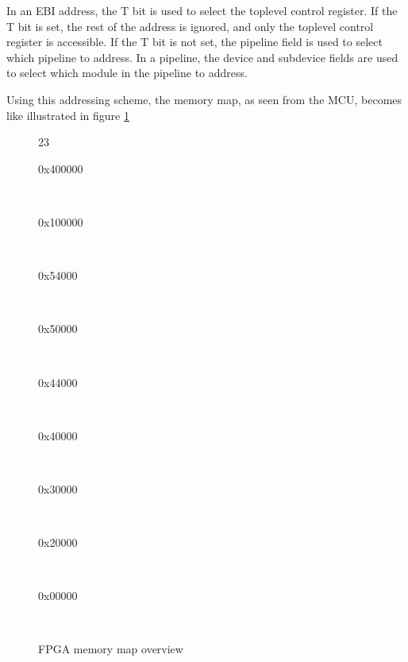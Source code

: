 In an EBI address, the T bit is used to select the toplevel control register.
If the T bit is set, the rest of the address is ignored, and only the toplevel
control register is accessible. If the T bit is not set, the pipeline field is
used to select which pipeline to address. In a pipeline, the device
and subdevice fields are used to select which module in the pipeline to address.

Using this addressing scheme, the memory map, as seen from the MCU, becomes
like illustrated in figure \ref{fig:fpga_memmap}

\begin{figure}
	\begin{bytefield}[bitwidth=0.035\linewidth,rightcurly=.,rightcurlyspace=0pt,endianness=big]{23}
		\\
		\begin{rightwordgroup}{0x400000}
		\end{rightwordgroup}\\
		\begin{rightwordgroup}{0x100000}
		\end{rightwordgroup}\\
		\begin{rightwordgroup}{0x54000}
		\end{rightwordgroup}\\
		\begin{rightwordgroup}{0x50000}
		\end{rightwordgroup}\\
		\begin{rightwordgroup}{0x44000}
		\end{rightwordgroup}\\
		\begin{rightwordgroup}{0x40000}
		\end{rightwordgroup}\\
		\begin{rightwordgroup}{0x30000}
		\end{rightwordgroup}\\
		\begin{rightwordgroup}{0x20000}
		\end{rightwordgroup}\\
		\begin{rightwordgroup}{0x00000}
		\end{rightwordgroup}\\
	\end{bytefield}

	\caption{FPGA memory map overview}
	\label{fig:fpga_memmap}
\end{figure}

\FloatBarrier

